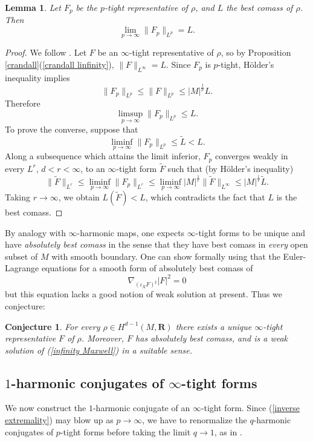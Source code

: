 \documentclass[reqno,11pt]{amsart}
\newcommand{\RR}{\mathbf{R}}
\newcommand{\dfn}[1]{\emph{#1}\index{#1}}
\newtheorem{lemma}[theorem]{Lemma}
\newtheorem{conjecture}[theorem]{Conjecture}
\theoremstyle{definition}
\numberwithin{equation}{section}
\begin{document}
\begin{lemma}\label{p tights approximate L}
Let $F_p$ be the $p$-tight representative of $\rho$, and $L$ the best comass of $\rho$. Then 
$$\lim_{p \to \infty} \|F_p\|_{L^p} = L.$$
\end{lemma}
\begin{proof}
We follow \cite[Lemma 2.7]{daskalopoulos2020transverse}.
Let $F$ be an $\infty$-tight representative of $\rho$, so by Proposition \ref{crandall}(\ref{crandall linfinity}), $\|F\|_{L^\infty} = L$.
Since $F_p$ is $p$-tight, H\"older's inequality implies 
$$\|F_p\|_{L^p} \leq \|F\|_{L^p} \leq |M|^{\frac{1}{p}} L.$$
Therefore 
$$\limsup_{p \to \infty} \|F_p\|_{L^p} \leq L.$$
To prove the converse, suppose that 
$$\liminf_{p \to \infty} \|F_p\|_{L^p} \leq \tilde L < L.$$
Along a subsequence which attains the limit inferior, $F_p$ converges weakly in every $L^r$, $d < r < \infty$, to an $\infty$-tight form $\tilde F$ such that (by H\"older's inequality)
$$\|\tilde F\|_{L^r} \leq \liminf_{p \to \infty} \|F_p\|_{L^r} \leq \liminf_{p \to \infty} |M|^{\frac{1}{r}} \|\tilde F\|_{L^\infty} \leq |M|^{\frac{1}{r}} \tilde L.$$
Taking $r \to \infty$, we obtain $L(\tilde F) < L$, which contradicts the fact that $L$ is the best comass.
\end{proof}

By analogy with $\infty$-harmonic maps, one expects $\infty$-tight forms to be unique and have \dfn{absolutely best comass} in the sense that they have best comass in \emph{every} open subset of $M$ with smooth boundary.
One can show formally using \cite[Theorem 5.2]{Barron2001} that the Euler-Lagrange equations for a smooth form of absolutely best comass of 
\begin{equation}\label{infinity Maxwell}
	\nabla_{(\iota_X F)^\sharp} |F|^2 = 0
\end{equation}
but this equation lacks a good notion of weak solution at present.
Thus we conjecture:

\begin{conjecture}
For every $\rho \in H^{d - 1}(M, \RR)$ there exists a unique $\infty$-tight representative $F$ of $\rho$.
Moreover, $F$ has absolutely best comass, and is a weak solution of (\ref{infinity Maxwell}) in a suitable sense.
\end{conjecture}


\subsection{\texorpdfstring{$1$-harmonic conjugates of $\infty$-tight forms}{One-harmonic conjugates of infinity-tight forms}}
We now construct the $1$-harmonic conjugate of an $\infty$-tight form.
Since (\ref{inverse extremality}) may blow up as $p \to \infty$, we have to renormalize the $q$-harmonic conjugates of $p$-tight forms before taking the limit $q \to 1$, as in \cite[\S3.2]{daskalopoulos2020transverse}.
\end{document}
